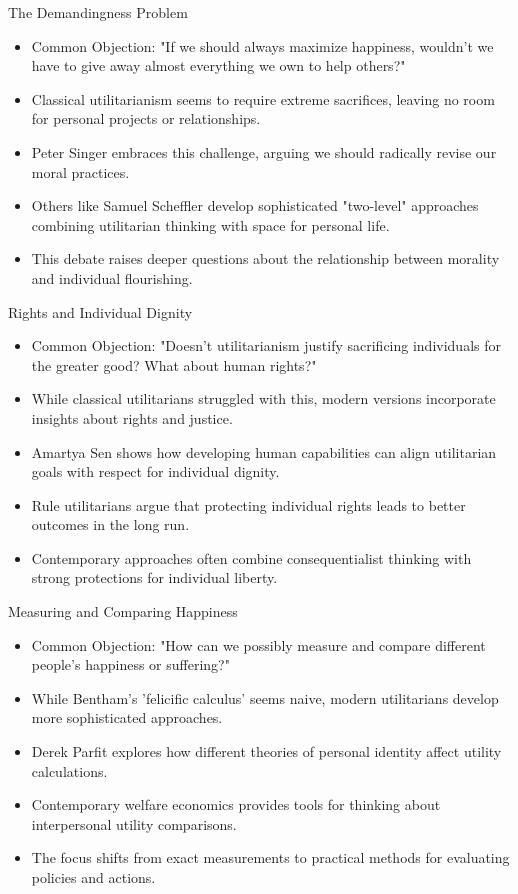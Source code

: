 \documentclass[aspectratio=169]{beamer}
\begin{document}
\begin{frame}{The Demandingness Problem}
\begin{itemize}
    \item Common Objection: "If we should always maximize happiness, wouldn't we have to give away almost everything we own to help others?"
    \item Classical utilitarianism seems to require extreme sacrifices, leaving no room for personal projects or relationships.
    \item Peter Singer embraces this challenge, arguing we should radically revise our moral practices.
    \item Others like Samuel Scheffler develop sophisticated "two-level" approaches combining utilitarian thinking with space for personal life.
    \item This debate raises deeper questions about the relationship between morality and individual flourishing.
\end{itemize}
\end{frame}

\begin{frame}{Rights and Individual Dignity}
\begin{itemize}
    \item Common Objection: "Doesn't utilitarianism justify sacrificing individuals for the greater good? What about human rights?"
    \item While classical utilitarians struggled with this, modern versions incorporate insights about rights and justice.
    \item Amartya Sen shows how developing human capabilities can align utilitarian goals with respect for individual dignity.
    \item Rule utilitarians argue that protecting individual rights leads to better outcomes in the long run.
    \item Contemporary approaches often combine consequentialist thinking with strong protections for individual liberty.
\end{itemize}
\end{frame}

\begin{frame}{Measuring and Comparing Happiness}
\begin{itemize}
    \item Common Objection: "How can we possibly measure and compare different people's happiness or suffering?"
    \item While Bentham's 'felicific calculus' seems naive, modern utilitarians develop more sophisticated approaches.
    \item Derek Parfit explores how different theories of personal identity affect utility calculations.
    \item Contemporary welfare economics provides tools for thinking about interpersonal utility comparisons.
    \item The focus shifts from exact measurements to practical methods for evaluating policies and actions.
    \end{itemize}
\end{frame}
\end{document}
